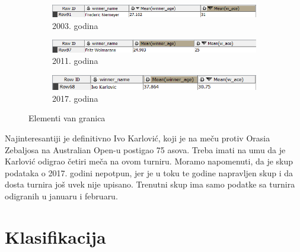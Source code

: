 \documentclass[a4paper]{article}
\begin{document}
\begin{figure}[H]
	\begin{subfigure}[h]{\textwidth}
		\begin{center}
			\includegraphics[width=1\textwidth]{Klasterovanje/FredericNiemeyer2003Outlier.png}
		\end{center}
		\caption{2003. godina}
		\label{fig:Autlajer2003}
	\end{subfigure}
	
	\vspace{0.5cm}
	\begin{subfigure}[h]{\textwidth}
		\begin{center}
			\includegraphics[width=1\textwidth]{Klasterovanje/FritzWolmarans2011Outlier.png}
		\end{center}
		\caption{2011. godina}
		\label{fig:Autlajer2011}
	\end{subfigure}
	
	\vspace{0.5cm}
	\begin{subfigure}[h]{\textwidth}
		\begin{center}
			\includegraphics[width=1\textwidth]{Klasterovanje/IvoKarlovic2017Outlier.png}
		\end{center}
		\caption{2017. godina}
		\label{fig:Autlajer2011}
	\end{subfigure}
	
	\caption{Elementi van granica}
	\label{fig:IgraciAutlajeri}
\end{figure} 

Najinteresantiji je definitivno Ivo Karlović, koji je na meču protiv Orasia Zebaljosa na Australian Open-u postigao 75 asova. Treba imati na umu da je Karlović odigrao četiri meča na ovom turniru. Moramo napomenuti, da je skup podataka o 2017. godini nepotpun, jer je u toku te godine napravljen skup i da dosta turnira još uvek nije upisano. Trenutni skup ima samo podatke sa turnira odigranih u januaru i februaru.  


\section{Klasifikacija}
\end{document}
